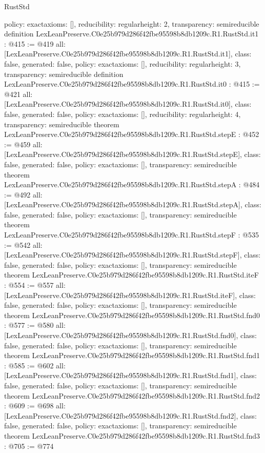 \begin{lexlean}{RustStd}
\begin{coremodule}
{  policy: exact{axioms: []},
  reducibility: regular{height: 2},
  transparency: semireducible
}
definition LexLeanPreserve.C0e25b979d286f42fbe95598b8db1209c.R1.RustStd.it1 : @415 := @419 {
  all: [LexLeanPreserve.C0e25b979d286f42fbe95598b8db1209c.R1.RustStd.it1],
  class: false,
  generated: false,
  policy: exact{axioms: []},
  reducibility: regular{height: 3},
  transparency: semireducible
}
definition LexLeanPreserve.C0e25b979d286f42fbe95598b8db1209c.R1.RustStd.it0 : @415 := @421 {
  all: [LexLeanPreserve.C0e25b979d286f42fbe95598b8db1209c.R1.RustStd.it0],
  class: false,
  generated: false,
  policy: exact{axioms: []},
  reducibility: regular{height: 4},
  transparency: semireducible
}
theorem LexLeanPreserve.C0e25b979d286f42fbe95598b8db1209c.R1.RustStd.stepE : @452 := @459 {
  all: [LexLeanPreserve.C0e25b979d286f42fbe95598b8db1209c.R1.RustStd.stepE],
  class: false,
  generated: false,
  policy: exact{axioms: []},
  transparency: semireducible
}
theorem LexLeanPreserve.C0e25b979d286f42fbe95598b8db1209c.R1.RustStd.stepA : @484 := @492 {
  all: [LexLeanPreserve.C0e25b979d286f42fbe95598b8db1209c.R1.RustStd.stepA],
  class: false,
  generated: false,
  policy: exact{axioms: []},
  transparency: semireducible
}
theorem LexLeanPreserve.C0e25b979d286f42fbe95598b8db1209c.R1.RustStd.stepF : @535 := @542 {
  all: [LexLeanPreserve.C0e25b979d286f42fbe95598b8db1209c.R1.RustStd.stepF],
  class: false,
  generated: false,
  policy: exact{axioms: []},
  transparency: semireducible
}
theorem LexLeanPreserve.C0e25b979d286f42fbe95598b8db1209c.R1.RustStd.iteF : @554 := @557 {
  all: [LexLeanPreserve.C0e25b979d286f42fbe95598b8db1209c.R1.RustStd.iteF],
  class: false,
  generated: false,
  policy: exact{axioms: []},
  transparency: semireducible
}
theorem LexLeanPreserve.C0e25b979d286f42fbe95598b8db1209c.R1.RustStd.fnd0 : @577 := @580 {
  all: [LexLeanPreserve.C0e25b979d286f42fbe95598b8db1209c.R1.RustStd.fnd0],
  class: false,
  generated: false,
  policy: exact{axioms: []},
  transparency: semireducible
}
theorem LexLeanPreserve.C0e25b979d286f42fbe95598b8db1209c.R1.RustStd.fnd1 : @585 := @602 {
  all: [LexLeanPreserve.C0e25b979d286f42fbe95598b8db1209c.R1.RustStd.fnd1],
  class: false,
  generated: false,
  policy: exact{axioms: []},
  transparency: semireducible
}
theorem LexLeanPreserve.C0e25b979d286f42fbe95598b8db1209c.R1.RustStd.fnd2 : @609 := @698 {
  all: [LexLeanPreserve.C0e25b979d286f42fbe95598b8db1209c.R1.RustStd.fnd2],
  class: false,
  generated: false,
  policy: exact{axioms: []},
  transparency: semireducible
}
theorem LexLeanPreserve.C0e25b979d286f42fbe95598b8db1209c.R1.RustStd.fnd3 : @705 := @774 {
}
\end{coremodule}
\end{lexlean}

